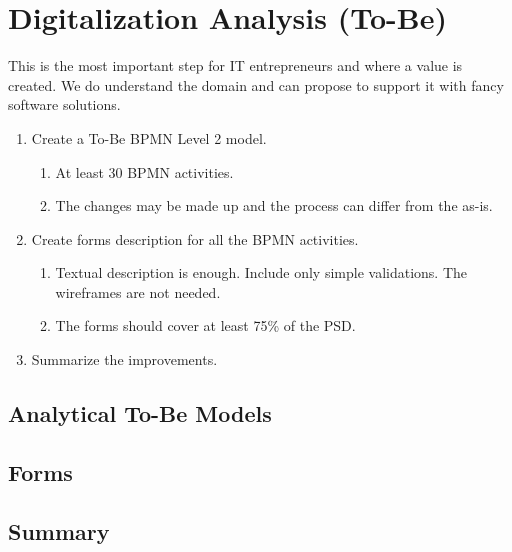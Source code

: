 \chapter{Digitalization Analysis (To-Be)}
This is the most important step for IT entrepreneurs and where a value is created. We do understand the domain and can propose to support it with fancy software solutions. 

\begin{enumerate}
    \item Create a To-Be BPMN Level 2 model. 
        \begin{enumerate}
            \item At least 30 BPMN activities. 
            \item The changes may be made up and the process can differ from the as-is. 
        \end{enumerate}
    \item Create forms description for all the BPMN activities. 
     \begin{enumerate}
            \item Textual description is enough. Include only simple validations. The wireframes are not needed. 
            \item The forms should cover at least 75\% of the PSD. 
        \end{enumerate}
    \item Summarize the improvements. 
\end{enumerate}

\section{Analytical To-Be Models}

\section{Forms}

\section{Summary}
